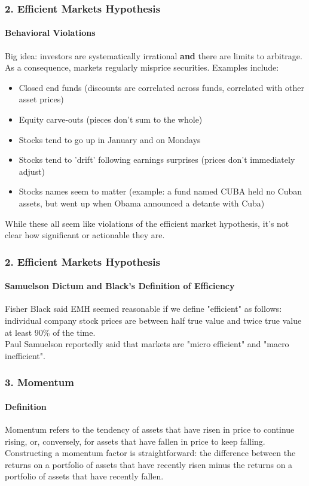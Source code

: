 \documentclass{beamer}
\begin{document}
\begin{frame}[t]
    \frametitle{2. Efficient Markets Hypothesis}
    \framesubtitle{Behavioral Violations}

    Big idea: investors are systematically irrational \textbf{and} there are limits to 
    arbitrage.   As a consequence, markets regularly misprice securities.  
    Examples include:
    \begin{itemize}
        \item Closed end funds (discounts are correlated across funds, correlated with other 
        asset prices)
        \item Equity carve-outs (pieces don't sum to the whole)
        \item Stocks tend to go up in January and on Mondays
        \item Stocks tend to 'drift' following earnings surprises (prices don't immediately 
       adjust)
        \item Stocks names seem to matter (example: a fund named CUBA held no Cuban assets, but 
        went up when Obama announced a detante with Cuba)
    \end{itemize}

    While these all seem like violations of the efficient market hypothesis, 
    it's not clear how significant or actionable they are.

\end{frame}

\begin{frame}[t]
    \frametitle{2. Efficient Markets Hypothesis}
    \framesubtitle{Samuelson Dictum and Black's Definition of Efficiency}

    Fisher Black said EMH seemed reasonable if we define "efficient" as follows: 
    individual company stock prices are between half true value and twice 
    true value at least 90\% of the time.\\
    \vspace{1em}
    Paul Samuelson reportedly said that markets are "micro efficient" and 
    "macro inefficient".\\ 


\end{frame}

\begin{frame}[t]
    \frametitle{3. Momentum}
    \framesubtitle{Definition}

    Momentum refers to the tendency of assets that have risen in price to continue rising, 
    or, conversely, for assets that have fallen in price to keep falling.\\
    \vspace{1em}
    Constructing a momentum factor is straightforward: 
    the difference between the returns on a portfolio of assets that have recently risen 
    minus the returns on a portfolio of assets that have recently fallen.

\end{frame}
\end{document}
